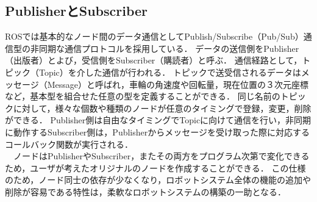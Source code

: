 \subsection{PublisherとSubscriber}
ROSでは基本的なノード間のデータ通信としてPublish/Subscribe（Pub/Sub）通信型の非同期な通信プロトコルを採用している．
データの送信側をPublisher（出版者）とよび，受信側をSubscriber（購読者）と呼ぶ．
通信経路として，トピック（Topic）を介した通信が行われる．
トピックで送受信されるデータはメッセージ（Message）と呼ばれ，車輪の角速度や回転量，現在位置の３次元座標など，基本型を組合せた任意の型を定義することができる．
同じ名前のトピックに対して，様々な個数や種類のノードが任意のタイミングで登録，変更，削除ができる．
Publisher側は自由なタイミングでTopicに向けて通信を行い，非同期に動作するSubscriber側は，Publisherからメッセージを受け取った際に対応するコールバック関数が実行される．
\\　ノードはPublisherやSubscriber，またその両方をプログラム次第で変化できるため，ユーザが考えたオリジナルのノードを作成することができる．
この仕様のため，ノード同士の依存が少なくなり，ロボットシステム全体の機能の追加や削除が容易である特性は，柔軟なロボットシステムの構築の一助となる．

